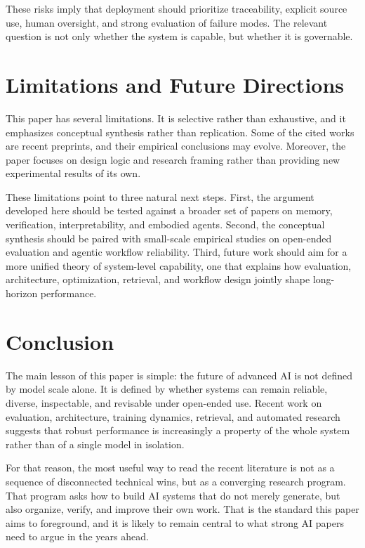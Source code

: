\documentclass[10pt,twocolumn]{article}
\begin{document}
These risks imply that deployment should prioritize traceability, explicit source use, human oversight, and strong evaluation of failure modes. The relevant question is not only whether the system is capable, but whether it is governable.

\section{Limitations and Future Directions}
This paper has several limitations. It is selective rather than exhaustive, and it emphasizes conceptual synthesis rather than replication. Some of the cited works are recent preprints, and their empirical conclusions may evolve. Moreover, the paper focuses on design logic and research framing rather than providing new experimental results of its own.

These limitations point to three natural next steps. First, the argument developed here should be tested against a broader set of papers on memory, verification, interpretability, and embodied agents. Second, the conceptual synthesis should be paired with small-scale empirical studies on open-ended evaluation and agentic workflow reliability. Third, future work should aim for a more unified theory of system-level capability, one that explains how evaluation, architecture, optimization, retrieval, and workflow design jointly shape long-horizon performance.

\section{Conclusion}
The main lesson of this paper is simple: the future of advanced AI is not defined by model scale alone. It is defined by whether systems can remain reliable, diverse, inspectable, and revisable under open-ended use. Recent work on evaluation, architecture, training dynamics, retrieval, and automated research suggests that robust performance is increasingly a property of the whole system rather than of a single model in isolation.

For that reason, the most useful way to read the recent literature is not as a sequence of disconnected technical wins, but as a converging research program. That program asks how to build AI systems that do not merely generate, but also organize, verify, and improve their own work. That is the standard this paper aims to foreground, and it is likely to remain central to what strong AI papers need to argue in the years ahead.



\end{document}
